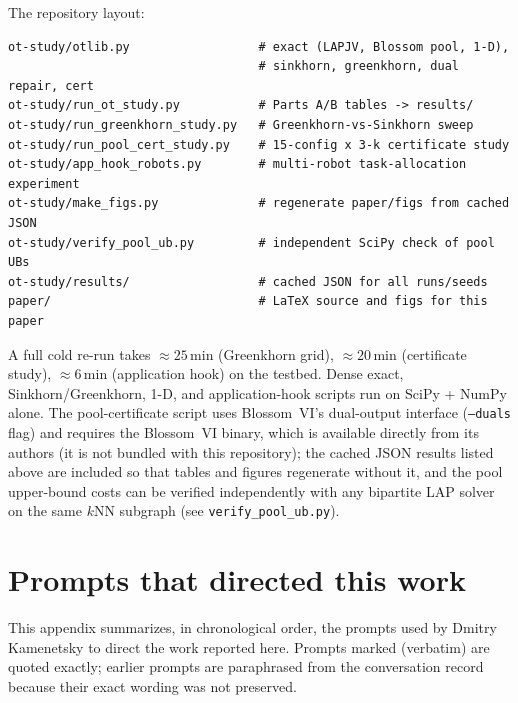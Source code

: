 \documentclass[11pt]{article}
\theoremstyle{remark}
\begin{document}
The repository layout:
\begin{verbatim}
ot-study/otlib.py                  # exact (LAPJV, Blossom pool, 1-D),
                                   # sinkhorn, greenkhorn, dual repair, cert
ot-study/run_ot_study.py           # Parts A/B tables -> results/
ot-study/run_greenkhorn_study.py   # Greenkhorn-vs-Sinkhorn sweep
ot-study/run_pool_cert_study.py    # 15-config x 3-k certificate study
ot-study/app_hook_robots.py        # multi-robot task-allocation experiment
ot-study/make_figs.py              # regenerate paper/figs from cached JSON
ot-study/verify_pool_ub.py         # independent SciPy check of pool UBs
ot-study/results/                  # cached JSON for all runs/seeds
paper/                             # LaTeX source and figs for this paper
\end{verbatim}
A full cold re-run takes $\approx 25\,\mathrm{min}$ (Greenkhorn grid),
$\approx 20\,\mathrm{min}$ (certificate study), $\approx 6\,\mathrm{min}$
(application hook) on the testbed. Dense exact, Sinkhorn/Greenkhorn,
1-D, and application-hook scripts run on SciPy + NumPy alone. The
pool-certificate script uses Blossom~VI's dual-output interface
(\texttt{--duals} flag) and requires the Blossom~VI binary, which is
available directly from its authors \cite{blossomvi} (it is not bundled
with this repository); the cached JSON results listed above are included
so that tables and figures regenerate without it, and the pool
upper-bound costs can be verified independently with any bipartite LAP
solver on the same $k$NN subgraph (see \texttt{verify\_pool\_ub.py}).

\section{Prompts that directed this work}
\label{app:prompts}

This appendix summarizes, in chronological order, the prompts used by
Dmitry Kamenetsky to direct the work reported here. Prompts marked (verbatim) are
quoted exactly; earlier prompts are paraphrased from the conversation
record because their exact wording was not preserved.
\end{document}
